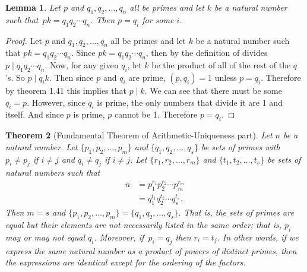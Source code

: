 \documentclass[12pt,leqno]{article}
\numberwithin{equation}{section}
\newtheorem{thm}{Theorem}[section]
\newtheorem{lem}[thm]{Lemma}
\theoremstyle{definition}
\begin{document}
\pagebreak

\begin{lem}
Let $p$ and $q_1, q_2, \hdots, q_n$ all be primes and let $k$ be a
natural number such that~$p k = q_1q_2 \cdots q_n$.  Then $p = q_i$
for some $i$.
\end{lem}

\begin{proof}[Proof]
Let $p$ and $q_1, q_2, \hdots, q_n$ all be primes and let $k$ be a natural number such that $p k = q_1q_2 \cdots q_n$.  Since $pk = q_1q_2 \cdots q_n$, then by the definition of divides $p \mid q_1q_2 \cdots q_n$.  Now, for any given $q_i$, let $k$ be the product of all of the rest of the $q$'s.  So $p \mid q_ik$.  Then since $p$ and $q_i$ are prime, $(p, q_i) = 1$ unless $p = q_i$.  Therefore by theorem 1.41 this implies that $p \mid k$.  We can see that there must be some $q_i = p$. However, since $q_i$ is prime, the only numbers that divide it are 1 and itself.  And since $p$ is prime, $p$ cannot be 1.  Therefore $p = q_i$.
\end{proof}

\pagebreak

\begin{thm}[Fundamental Theorem of Arithmetic-Uniqueness part]
Let $n$ be a natural number.  Let $\{p_1, p_2, \hdots, p_m\}$ and
$\{q_1, q_2, \hdots, q_s\}$ be sets of primes with $p_i \neq p_j$ if
$i \neq j$ and $q_i \neq q_j$ if $i \neq j$. Let $\{r_1, r_2,
\hdots, r_m\}$ and $\{t_1, t_2, \hdots, t_s\}$ be sets of natural
numbers such that
\begin{align*}
n & = p_1^{r_1}p_2^{r_2}\cdots p_m^{r_m} \\
  & = q_1^{t_1}q_2^{t_2}\cdots q_s^{t_s}.
\end{align*}
Then $m = s$ and $\{p_1, p_2, \hdots, p_m\} = \{q_1, q_2, \hdots,
q_s\}$. That is, the sets of primes are equal but their elements are
not necessarily listed in the same order; that is, $p_i$ may or may
not equal $q_i$.  Moreover, if~$p_i = q_j$ then $r_i = t_j$.  In
other words, if we express the same natural number as a product of
powers of distinct primes, then the expressions are identical except
for the ordering of the factors.
\end{thm}
\end{document}
